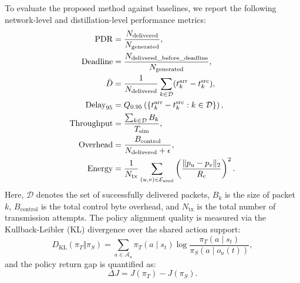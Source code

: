 To evaluate the proposed method against baselines, we report the following network-level and distillation-level performance metrics:
\begin{align}
\mathrm{PDR} &= \frac{N_{\mathrm{delivered}}}{N_{\mathrm{generated}}}, \\
\mathrm{Deadline} &= \frac{N_{\mathrm{delivered\_before\_deadline}}}{N_{\mathrm{generated}}}, \\
\bar{D} &= \frac{1}{N_{\mathrm{delivered}}} \sum_{k \in \mathcal{D}} (t_k^{\mathrm{arr}} - t_k^{\mathrm{src}}), \\
\mathrm{Delay}_{95} &= Q_{0.95} \left( \{t_k^{\mathrm{arr}} - t_k^{\mathrm{src}} : k \in \mathcal{D}\} \right), \\
\mathrm{Throughput} &= \frac{\sum_{k \in \mathcal{D}} B_k}{T_{\mathrm{sim}}}, \\
\mathrm{Overhead} &= \frac{B_{\mathrm{control}}}{N_{\mathrm{delivered}} + \epsilon}, \\
\mathrm{Energy} &= \frac{1}{N_{\mathrm{tx}}} \sum_{(u,v) \in \mathcal{E}_{\mathrm{used}}} \left( \frac{\|p_u - p_v\|_2}{R_c} \right)^2.
\end{align}
Here, $\mathcal{D}$ denotes the set of successfully delivered packets, $B_k$ is the size of packet $k$, $B_{\mathrm{control}}$ is the total control byte overhead, and $N_{\mathrm{tx}}$ is the total number of transmission attempts. The policy alignment quality is measured via the Kullback-Leibler (KL) divergence over the shared action support:
\begin{equation}
    D_{\mathrm{KL}}(\pi_T \Vert \pi_S) = \sum_{a \in \mathcal{A}_u} \pi_T(a \mid s_t) \log \frac{\pi_T(a \mid s_t)}{\pi_S(a \mid o_u(t))},
\end{equation}
and the policy return gap is quantified as:
\begin{equation}
    \Delta J = J(\pi_T) - J(\pi_S).
\end{equation}

